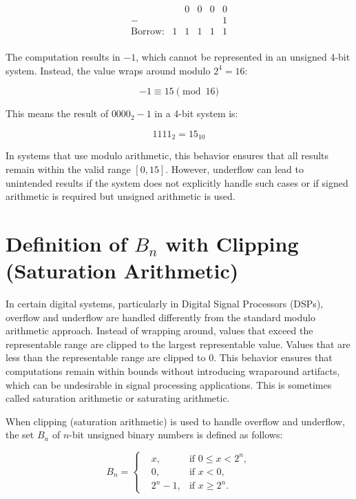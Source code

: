 \[
\begin{array}{rccccc}
       &   & 0 & 0 & 0 & 0 \\ %
    -  &   &   &   &   & 1 \\ %
    \hline
\text{Borrow:} & 1 & 1 & 1 & 1 & 1 \\ %
\end{array}
\]

The computation results in \( -1 \), which cannot be represented in an unsigned 4-bit system. Instead, the value wraps around modulo \( 2^4 = 16 \):

\[
-1 \equiv 15 \pmod{16}
\]

This means the result of \( 0000_2 - 1 \) in a 4-bit system is:

\[
1111_2 = 15_{10}
\]

In systems that use modulo arithmetic, this behavior ensures that all results remain within the valid range \( [0, 15] \). However, underflow can lead to unintended results if the system does not explicitly handle such cases or if signed arithmetic is required but unsigned arithmetic is used.


\section{Definition of \( B_n \) with Clipping (Saturation Arithmetic)}
In certain digital systems, particularly in Digital Signal Processors (DSPs), overflow and underflow are handled differently from the standard modulo arithmetic approach. Instead of wrapping around, values that exceed the representable range are clipped to the largest representable value. Values that are less than the representable range are clipped to $0$. 
This behavior ensures that computations remain within bounds without introducing wraparound artifacts, which can be undesirable in signal processing applications. This is sometimes called saturation arithmetic or saturating arithmetic.

When clipping (saturation arithmetic) is used to handle overflow and underflow, the set \( B_n \) of \( n \)-bit unsigned binary numbers is defined as follows:

\[
B_n = \left\{ 
\begin{aligned}
&x, &\text{if } 0 \leq x < 2^n, \\
&0, &\text{if } x < 0, \\
&2^n - 1, &\text{if } x \geq 2^n.
\end{aligned}
\right.
\]

